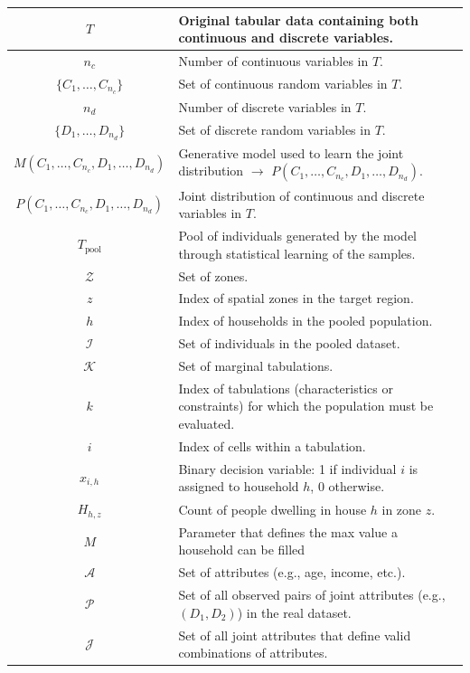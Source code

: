 \begin{longtable}{|c|p{10cm}|}
\( T \) & Original tabular data containing both continuous and discrete variables. \\ \hline
\( n_c \) & Number of continuous variables in \( T \). \\ \hline
\( \{C_1, \dots, C_{n_c}\} \) & Set of continuous random variables in \( T \). \\ \hline
\( n_d \) & Number of discrete variables in \( T \). \\ \hline
\( \{D_1, \dots, D_{n_d}\} \) & Set of discrete random variables in \( T \). \\ \hline
\( M(C_1, \dots, C_{n_c}, D_1, \dots, D_{n_d}) \) & Generative model used to learn the joint distribution $\rightarrow$ \( P(C_1, \dots, C_{n_c}, D_1, \dots, D_{n_d}) \). \\ \hline
\( P(C_1, \dots, C_{n_c}, D_1, \dots, D_{n_d}) \) & Joint distribution of continuous and discrete variables in \( T \). \\ \hline
\( T_{\text{pool}} \) & Pool of individuals generated by the model through statistical learning of the samples. \\ \hline
\( \mathcal{Z} \) & Set of zones. \\ \hline
\( z \) & Index of spatial zones in the target region. \\ \hline
\( h \) & Index of households in the pooled population. \\ \hline
\( \mathcal{I} \) & Set of individuals in the pooled dataset. \\ \hline
\( \mathcal{K} \) & Set of marginal tabulations. \\ \hline
\( k \) & Index of tabulations (characteristics or constraints) for which the population must be evaluated. \\ \hline
\( i \) & Index of cells within a tabulation. \\ \hline
\( x_{i,h} \) & Binary decision variable: 1 if individual \( i \) is assigned to household \( h \), 0 otherwise. \\ \hline
\( H_{h,z} \) &Count of people dwelling in house \( h \) in zone \( z \). \\ \hline
$M$ & Parameter that defines the max value a household can be filled \\ \hline
\( \mathcal{A} \) & Set of attributes (e.g., age, income, etc.). \\ \hline
\( \mathcal{P} \) & Set of all observed pairs of joint attributes (e.g., \( (D_1, D_2) \)) in the real dataset. \\ \hline
\( \mathcal{J} \) & Set of all joint attributes that define valid combinations of attributes. \\ \hline

\end{longtable}
